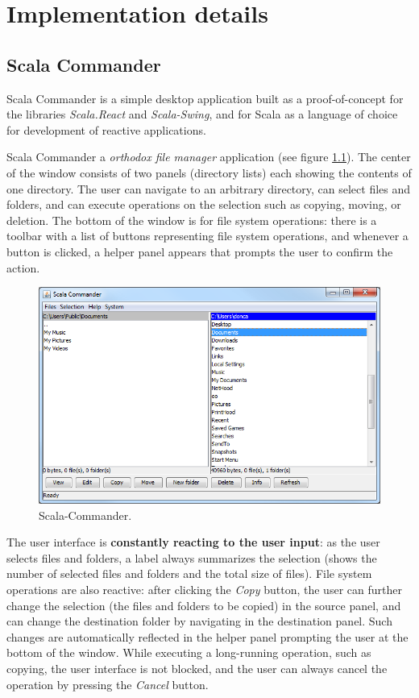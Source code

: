 
\chapter{Implementation details}\label{chap:implementation-details}

\section{Scala Commander}\label{sec:impl_scala-commander}

Scala Commander is a simple desktop application built as a proof-of-concept for the libraries \emph{Scala.React} and \emph{Scala-Swing}, and for Scala as a language of choice for development of reactive applications.

Scala Commander a \emph{orthodox file manager} application (see figure \ref{fig:scomm_main}). The center of the window consists of two panels (directory lists) each showing the contents of one directory. The user can navigate to an arbitrary directory, can select files and folders, and can execute operations on the selection such as copying, moving, or deletion. The bottom of the window is for file system operations: there is a toolbar with a list of buttons representing file system operations, and whenever a button is clicked, a helper panel appears that prompts the user to confirm the action.

\begin{figure}[h!] 
  \centering
    \includegraphics[width=1\textwidth]{images/scala-commander-main.png}
  \caption{Scala-Commander.}
  \label{fig:scomm_main}  
\end{figure}

The user interface is \textbf{constantly reacting to the user input}: as the user selects files and folders, a label always summarizes the selection (shows the number of selected files and folders and the total size of files). File system operations are also reactive: after clicking the \emph{Copy} button, the user can further change the selection (the files and folders to be copied) in the source panel, and can change the destination folder by navigating in the destination panel. Such changes are automatically reflected in the helper panel prompting the user at the bottom of the window. While executing a long-running operation, such as copying, the user interface is not blocked, and the user can always cancel the operation by pressing the \emph{Cancel} button.

